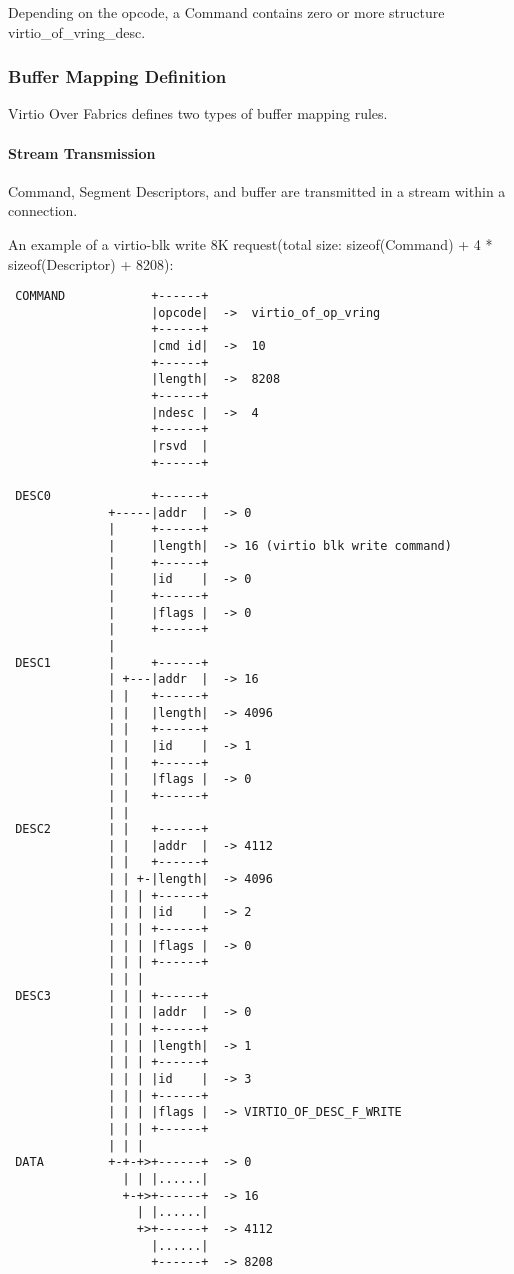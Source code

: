 Depending on the opcode, a Command contains zero or more structure virtio_of_vring_desc.

\subsubsection{Buffer Mapping Definition}\label{sec:Virtio Transport Options / Virtio Over Fabrics / Transmission Protocol / Buffer Mapping Definition}
Virtio Over Fabrics defines two types of buffer mapping rules.

\paragraph{Stream Transmission}\label{sec:Virtio Transport Options / Virtio Over Fabrics / Transmission Protocol / Commands Definition / Stream Transmission}
Command, Segment Descriptors, and buffer are transmitted in a stream within a connection.

An example of a virtio-blk write 8K request(total size: sizeof(Command) + 4 * sizeof(Descriptor) + 8208):
\begin{lstlisting}
 COMMAND            +------+
                    |opcode|  ->  virtio_of_op_vring
                    +------+
                    |cmd id|  ->  10
                    +------+
                    |length|  ->  8208
                    +------+
                    |ndesc |  ->  4
                    +------+
                    |rsvd  |
                    +------+

 DESC0              +------+
              +-----|addr  |  -> 0
              |     +------+
              |     |length|  -> 16 (virtio blk write command)
              |     +------+
              |     |id    |  -> 0
              |     +------+
              |     |flags |  -> 0
              |     +------+
              |
 DESC1        |     +------+
              | +---|addr  |  -> 16
              | |   +------+
              | |   |length|  -> 4096
              | |   +------+
              | |   |id    |  -> 1
              | |   +------+
              | |   |flags |  -> 0
              | |   +------+
              | |
 DESC2        | |   +------+
              | |   |addr  |  -> 4112
              | |   +------+
              | | +-|length|  -> 4096
              | | | +------+
              | | | |id    |  -> 2
              | | | +------+
              | | | |flags |  -> 0
              | | | +------+
              | | |
 DESC3        | | | +------+
              | | | |addr  |  -> 0
              | | | +------+
              | | | |length|  -> 1
              | | | +------+
              | | | |id    |  -> 3
              | | | +------+
              | | | |flags |  -> VIRTIO_OF_DESC_F_WRITE
              | | | +------+
              | | |
 DATA         +-+-+>+------+  -> 0
                | | |......|
                +-+>+------+  -> 16
                  | |......|
                  +>+------+  -> 4112
                    |......|
                    +------+  -> 8208
\end{lstlisting}

